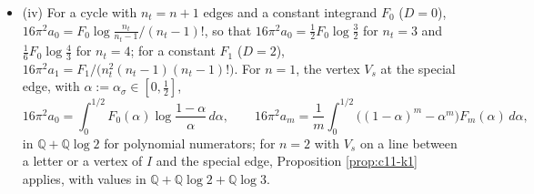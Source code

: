 \begin{theorem}
\begin{itemize}
with $\Upsilon^0_y$ the translation-invariant part along the generator $y$ centred at $x_O$, the rotation $M_{\omega_{x_O}}$ having the vector field $\omega_{x_O}z$; the monomials $z^\mu$ and $z^\mu z^\nu$ of the Killing data act as $-i\partial_{r_\mu}$ and $-\partial_{r_\mu}\partial_{r_\nu}$ at $r=0$. At every finite $T$ the coefficients of the expansion in $\varepsilon$ are given by \eqref{eq:c11-oddsimplex}, and $T\partial_T$ of every defect cycle is $O(\varepsilon)$: $\Upsilon_{K_b}$ is independent of $T$.
\item (iv) For a cycle with $n_t=n+1$ edges and a constant integrand $F_0$ ($D=0$), $16\pi^2a_0=F_0\log\frac{n_t}{n_t-1}\big/(n_t-1)!$, so that $16\pi^2a_0=\tfrac12F_0\log\tfrac32$ for $n_t=3$ and $\tfrac16F_0\log\tfrac43$ for $n_t=4$; for a constant $F_1$ ($D=2$), $16\pi^2a_1=F_1\big/\big(n_t^2(n_t-1)(n_t-1)!\big)$. For $n=1$, the vertex $V_s$ at the special edge, with $\alpha:=\alpha_\sigma\in[0,\tfrac12]$,
\[
16\pi^2a_0=\int_0^{1/2}F_0(\alpha)\log\frac{1-\alpha}\alpha\,d\alpha,\qquad 16\pi^2a_m=\frac1m\int_0^{1/2}\big((1-\alpha)^m-\alpha^m\big)F_m(\alpha)\,d\alpha,
\]
in $\mathbb Q+\mathbb Q\log2$ for polynomial numerators; for $n=2$ with $V_s$ on a line between a letter or a vertex of $I$ and the special edge, Proposition \ref{prop:c11-k1} applies, with values in $\mathbb Q+\mathbb Q\log2+\mathbb Q\log3$.
\end{itemize}
\end{theorem}


